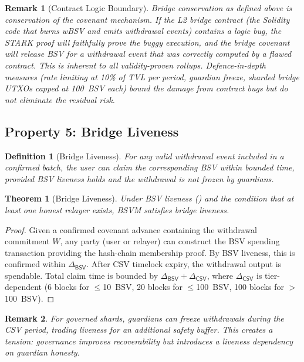 \documentclass[11pt,a4paper]{article}
\newtheorem{definition}{Definition}[section]
\newtheorem{theorem}{Theorem}[section]
\newtheorem{remark}{Remark}[section]
\newcommand{\BSV}{\mathsf{BSV}}
\begin{document}
\begin{remark}[Contract Logic Boundary]\label{rem:contract}
Bridge conservation as defined above is conservation of the \emph{covenant mechanism}. If the L2 bridge \emph{contract} (the Solidity code that burns wBSV and emits withdrawal events) contains a logic bug, the STARK proof will faithfully prove the buggy execution, and the bridge covenant will release BSV for a withdrawal event that was correctly computed by a flawed contract. This is inherent to all validity-proven rollups. Defence-in-depth measures (rate limiting at 10\% of TVL per period, guardian freeze, sharded bridge UTXOs capped at 100~BSV each) bound the damage from contract bugs but do not eliminate the residual risk.
\end{remark}


\subsection{Property 5: Bridge Liveness}

\begin{definition}[Bridge Liveness]\label{def:bridge-live}
For any valid withdrawal event included in a confirmed batch, the user can claim the corresponding BSV within bounded time, provided BSV liveness holds and the withdrawal is not frozen by guardians.
\end{definition}

\begin{theorem}[Bridge Liveness]\label{thm:bridge-live}
Under BSV liveness () and the condition that at least one honest relayer exists, BSVM satisfies bridge liveness.
\end{theorem}

\begin{proof}
Given a confirmed covenant advance containing the withdrawal commitment $W$, any party (user or relayer) can construct the BSV spending transaction providing the hash-chain membership proof. By BSV liveness, this is confirmed within $\Delta_{\BSV}$. After CSV timelock expiry, the withdrawal output is spendable. Total claim time is bounded by $\Delta_{\BSV} + \Delta_{\mathsf{CSV}}$, where $\Delta_{\mathsf{CSV}}$ is tier-dependent (6 blocks for $\leq$10~BSV, 20 blocks for $\leq$100~BSV, 100 blocks for $>$100~BSV). \qedhere
\end{proof}

\begin{remark}
For governed shards, guardians can freeze withdrawals during the CSV period, trading liveness for an additional safety buffer. This creates a tension: governance improves recoverability but introduces a liveness dependency on guardian honesty.
\end{remark}
\end{document}
